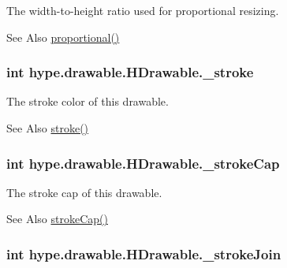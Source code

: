 The width-\/to-\/height ratio used for proportional resizing. 

\begin{DoxySeeAlso}{See Also}
\hyperlink{classhype_1_1drawable_1_1_h_drawable_a0b4162d5fbb7f045f84143beeafe4fb1}{proportional()} 
\end{DoxySeeAlso}
\hypertarget{classhype_1_1drawable_1_1_h_drawable_af1f14544d296c95e0e3323b045a474bc}{
\subsubsection[{\-\_\-stroke}]{\setlength{\rightskip}{0pt plus 5cm}int hype.\-drawable.\-H\-Drawable.\-\_\-stroke\hspace{0.3cm}{\ttfamily [protected]}}}\label{classhype_1_1drawable_1_1_h_drawable_af1f14544d296c95e0e3323b045a474bc}


The stroke color of this drawable. 

\begin{DoxySeeAlso}{See Also}
\hyperlink{classhype_1_1drawable_1_1_h_drawable_a71c0f994e78e4abca14513d48e014ee6}{stroke()} 
\end{DoxySeeAlso}
\hypertarget{classhype_1_1drawable_1_1_h_drawable_aecbc1d0d94d82b8b6cd3c5ebb3aa49d7}{
\subsubsection[{\-\_\-stroke\-Cap}]{\setlength{\rightskip}{0pt plus 5cm}int hype.\-drawable.\-H\-Drawable.\-\_\-stroke\-Cap\hspace{0.3cm}{\ttfamily [protected]}}}\label{classhype_1_1drawable_1_1_h_drawable_aecbc1d0d94d82b8b6cd3c5ebb3aa49d7}


The stroke cap of this drawable. 

\begin{DoxySeeAlso}{See Also}
\hyperlink{classhype_1_1drawable_1_1_h_drawable_aa0881e861ef7eda3d2d554d64b63bfa6}{stroke\-Cap()} 
\end{DoxySeeAlso}
\hypertarget{classhype_1_1drawable_1_1_h_drawable_adccbb5aa62cca3f1615e79af5eed0c99}{
\subsubsection[{\-\_\-stroke\-Join}]{\setlength{\rightskip}{0pt plus 5cm}int hype.\-drawable.\-H\-Drawable.\-\_\-stroke\-Join\hspace{0.3cm}{\ttfamily [protected]}}}\label{classhype_1_1drawable_1_1_h_drawable_adccbb5aa62cca3f1615e79af5eed0c99}


